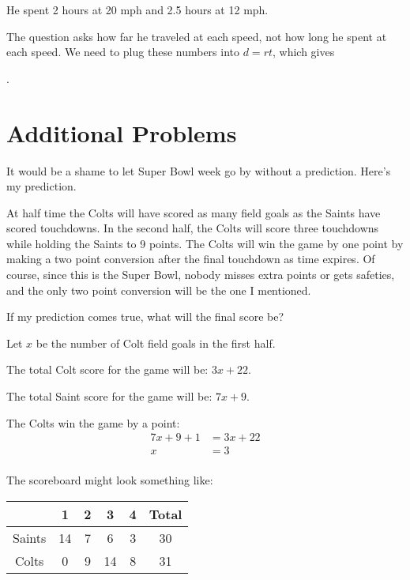 \documentclass[letterpaper]{exam}
\begin{document}
\begin{description}
      He spent 2 hours at 20 mph and 2.5 hours at 12 mph.  

      The question asks how far he traveled at each speed, not how long he spent at each speed.  We need to plug these
      numbers into $d = rt$, which gives 
      
      .  

  \end{description}
  \fi

  \section{Additional Problems}

  \begin{questions}
    \question{}
      It would be a shame to let Super Bowl week go by without a prediction.  Here's my prediction.

      At half time the Colts will have scored as many field goals as the Saints have scored touchdowns.  In the second
      half, the Colts will score three touchdowns while holding the Saints to 9 points.  The Colts will win the game by
      one point by making a two point conversion after the final touchdown as time expires.  Of course, since this is the
      Super Bowl, nobody misses extra points or gets safeties, and the only two point conversion will be the one I
      mentioned.

      If my prediction comes true, what will the final score be?

      \begin{solution}
        Let $x$ be the number of Colt field goals in the first half.

        The total Colt score for the game will be: $3x + 22$.

        The total Saint score for the game will be: $7x + 9$.

        The Colts win the game by a point:
        \begin{align*}
          7x + 9 + 1 & = 3x + 22 \\
          x          & = 3 \\
        \end{align*}

        The scoreboard might look something like:

        \begin{tabular}[H]{cccccc}
          \toprule
                   & 1  & 2 & 3  & 4 & Total \\
          \midrule
            Saints & 14 & 7 & 6  & 3 & 30 \\
            Colts  & 0  & 9 & 14 & 8 & 31 \\
          \bottomrule
        \end{tabular}


\end{solution}
\end{questions}
\end{document}
